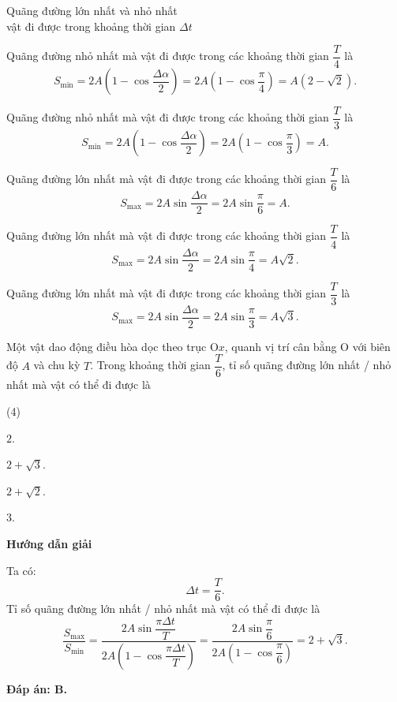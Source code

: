 \begin{dang}{Quãng đường lớn nhất và nhỏ nhất\\ vật đi được trong khoảng thời gian $\Delta t$}
{		Quãng đường nhỏ nhất mà vật đi được trong các khoảng thời gian $\dfrac{T}{4}$ là 
		\begin{equation*}
			S_\text{min}=2A\left(1-\cos\dfrac{\Delta \alpha}{2}\right)=2A\left(1-\cos\dfrac{\pi}{4}\right)=A(2-\sqrt{2}).
		\end{equation*}
		
		Quãng đường nhỏ nhất mà vật đi được trong các khoảng thời gian $\dfrac{T}{3}$ là 
		\begin{equation*}
			S_\text{min}=2A\left(1-\cos\dfrac{\Delta \alpha}{2}\right)=2A\left(1-\cos\dfrac{\pi}{3}\right)=A.
		\end{equation*}
		
		Quãng đường lớn nhất mà vật đi được trong các khoảng thời gian $\dfrac{T}{6}$ là 
		\begin{equation*}
			S_\text{max}=2A\sin\dfrac{\Delta \alpha}{2}=2A\sin\dfrac{\pi}{6}=A.
		\end{equation*}
		
		Quãng đường lớn nhất mà vật đi được trong các khoảng thời gian $\dfrac{T}{4}$ là 
		\begin{equation*}
			S_\text{max}=2A\sin\dfrac{\Delta \alpha}{2}=2A\sin\dfrac{\pi}{4}=A\sqrt{2}.
		\end{equation*}
		
		Quãng đường lớn nhất mà vật đi được trong các khoảng thời gian $\dfrac{T}{3}$ là 
		\begin{equation*}
			S_\text{max}=2A\sin\dfrac{\Delta \alpha}{2}=2A\sin\dfrac{\pi}{3}=A\sqrt{3}.
		\end{equation*}
	}
	{
		Một vật dao động điều hòa dọc theo trục O$x$, quanh vị trí cân bằng O với biên độ $A$ và chu kỳ $T$. Trong khoảng thời gian $\dfrac{T}{6}$, tỉ số quãng đường lớn nhất / nhỏ nhất mà vật có thể đi được là
		\begin{mcq}(4)
			\item $2$.
			\item $2+\sqrt 3$.
			\item $2+\sqrt 2$.
			\item $3$. 
		\end{mcq}
	}
	{
		\begin{center}
			\textbf{Hướng dẫn giải}
		\end{center}
		
		Ta có:
		\begin{equation*}
			\Delta t =\dfrac{T}{6}.
		\end{equation*}
		Tỉ số quãng đường lớn nhất / nhỏ nhất mà vật có thể đi được là
		\begin{equation*}
			\dfrac{S_\text{max}}{S_\text{min}} = \dfrac{2A \sin \dfrac{\pi \Delta t}{T}}{2A\left (1-\cos \dfrac{\pi \Delta t }{T}\right)}=\dfrac{2A\sin \dfrac{\pi}{6}}{2A\left(1-\cos \dfrac{\pi}{6}\right)} =2+\sqrt 3.
		\end{equation*}
		
		\textbf{Đáp án: B.}
	}
\end{dang}
